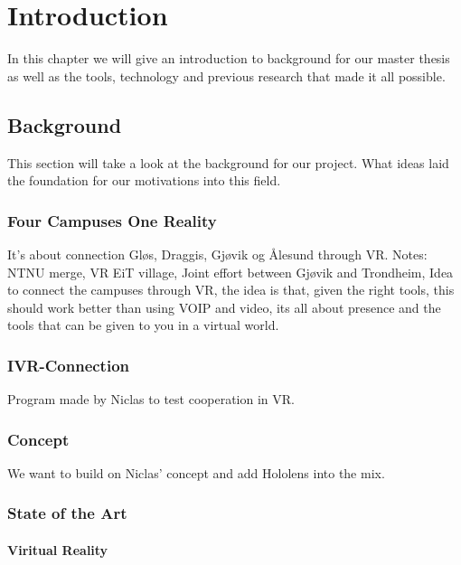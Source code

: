 \chapter{Introduction}
\label{chap:introduction}
In this chapter we will give an introduction to background for our master thesis as well as the tools, technology and previous research that made it all possible. 

\section{Background}
    This section will take a look at the background for our project. What ideas laid the foundation for our motivations into this field.

    \subsection{Four Campuses One Reality}
    It's about connection Gløs, Draggis, Gjøvik og Ålesund through VR.
    Notes: NTNU merge, VR EiT village, Joint effort between Gjøvik and Trondheim, Idea to connect the campuses through VR, the idea is that, given the right tools, this should work better than using VOIP and video, its all about presence and the tools that can be given to you in a virtual world.

    \subsection{IVR-Connection}
    Program made by Niclas to test cooperation in VR.

    \subsection{Concept}
    We want to build on Niclas' concept and add Hololens into the mix.
    
    \subsection{State of the Art}
    \subsubsection{Viritual Reality}
